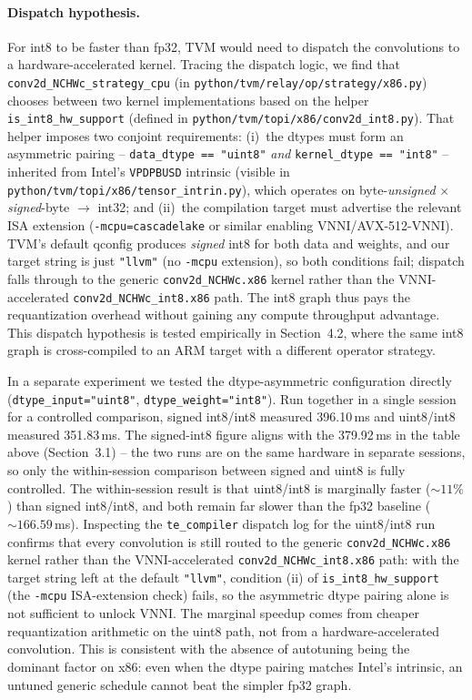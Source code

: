 \documentclass[11pt,a4paper]{article}
\begin{document}
\paragraph{Dispatch hypothesis.} For int8 to be faster than fp32, TVM would need to dispatch the convolutions to a hardware-accelerated kernel. Tracing the dispatch logic, we find that \texttt{conv2d\_NCHWc\_\allowbreak strategy\_cpu} (in \texttt{python/tvm/relay/op/strategy/x86.py}) chooses between two kernel implementations based on the helper \texttt{is\_int8\_hw\_support} (defined in \texttt{python/tvm/topi/x86/\allowbreak conv2d\_int8.py}). That helper imposes two conjoint requirements: (i)~the dtypes must form an asymmetric pairing -- \texttt{data\_dtype == "uint8"} \emph{and} \texttt{kernel\_dtype == "int8"} -- inherited from Intel's \texttt{VPDPBUSD} intrinsic (visible in \texttt{python/tvm/topi/x86/\allowbreak tensor\_intrin.py}), which operates on byte-\emph{unsigned} $\times$ \emph{signed}-byte $\rightarrow$ int32; and (ii)~the compilation target must advertise the relevant ISA extension (\texttt{-mcpu=cascadelake} or similar enabling VNNI/AVX-512-VNNI). TVM's default qconfig produces \emph{signed} int8 for both data and weights, and our target string is just \texttt{"llvm"} (no \texttt{-mcpu} extension), so both conditions fail; dispatch falls through to the generic \texttt{conv2d\_\allowbreak NCHWc.x86} kernel rather than the VNNI-accelerated \texttt{conv2d\_\allowbreak NCHWc\_int8.x86} path. The int8 graph thus pays the requantization overhead without gaining any compute throughput advantage. This dispatch hypothesis is tested empirically in Section~4.2, where the same int8 graph is cross-compiled to an ARM target with a different operator strategy.

In a separate experiment we tested the dtype-asymmetric configuration directly (\texttt{dtype\_input="uint8"}, \texttt{dtype\_weight="int8"}). Run together in a single session for a controlled comparison, signed int8/int8 measured 396.10\,ms and uint8/int8 measured 351.83\,ms. The signed-int8 figure aligns with the 379.92\,ms in the table above (Section~3.1) -- the two runs are on the same hardware in separate sessions, so only the within-session comparison between signed and uint8 is fully controlled. The within-session result is that uint8/int8 is marginally faster (${\sim}11\%$) than signed int8/int8, and both remain far slower than the fp32 baseline (${\sim}166.59$\,ms). Inspecting the \texttt{te\_compiler} dispatch log for the uint8/int8 run confirms that every convolution is still routed to the generic \texttt{conv2d\_NCHWc.x86} kernel rather than the VNNI-accelerated \texttt{conv2d\_NCHWc\_int8.x86} path: with the target string left at the default \texttt{"llvm"}, condition (ii) of \texttt{is\_int8\_hw\_support} (the \texttt{-mcpu} ISA-extension check) fails, so the asymmetric dtype pairing alone is not sufficient to unlock VNNI. The marginal speedup comes from cheaper requantization arithmetic on the uint8 path, not from a hardware-accelerated convolution. This is consistent with the absence of autotuning being the dominant factor on x86: even when the dtype pairing matches Intel's intrinsic, an untuned generic schedule cannot beat the simpler fp32 graph.
\end{document}
